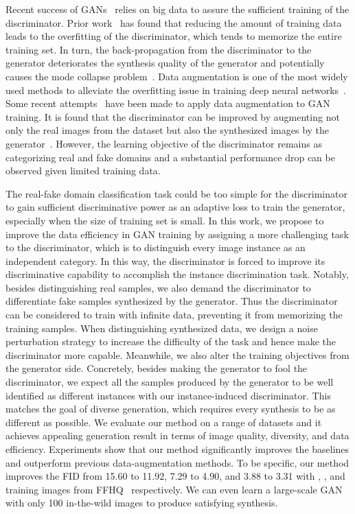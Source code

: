 \documentclass{article}
\begin{document}
Recent success of GANs~\cite{karras2017progressive, karras2019style, Karras2019stylegan2, brock2018large} relies on big data to assure the sufficient training of the discriminator.
Prior work~\cite{zhao2020differentiable, karras2020training} has found that reducing the amount of training data leads to the overfitting of the discriminator, which tends to memorize the entire training set.
In turn, the back-propagation from the discriminator to the generator deteriorates the synthesis quality of the generator and potentially causes the mode collapse problem~\cite{arjovsky2017towards, zhang2018pa}.
Data augmentation is one of the most widely used methods to alleviate the overfitting issue in training deep neural networks~\cite{zhang2017mixup,cubuk2020randaugment,cubuk2018autoaugment}.
Some recent attempts~\cite{karras2020training, tran2021data, zhao2020differentiable, zhao2020image, zhang2018pa} have been made to apply data augmentation to GAN training.
It is found that the discriminator can be improved by augmenting not only the real images from the dataset but also the synthesized images by the generator~\cite{zhao2020differentiable, karras2020training}.
However, the learning objective of the discriminator remains as categorizing real and fake domains and a substantial performance drop can be observed given limited training data.


The real-fake domain classification task could be too simple for the discriminator to gain sufficient discriminative power as an adaptive loss to train the generator, especially when the size of training set is small.
In this work, we propose to improve the data efficiency in GAN training by assigning a more challenging task to the discriminator, which is to distinguish every image instance as an independent category.
In this way, the discriminator is forced to improve its discriminative capability to accomplish the instance discrimination task.
Notably, besides distinguishing real samples, we also demand the discriminator to differentiate fake samples synthesized by the generator.
Thus the discriminator can be considered to train with infinite data, preventing it from memorizing the training samples.
When distinguishing synthesized data, we design a noise perturbation strategy to increase the difficulty of the task and hence make the discriminator more capable.
Meanwhile, we also alter the training objectives from the generator side.
Concretely, besides making the generator to fool the discriminator, we expect all the samples produced by the generator to be well identified as different instances with our instance-induced discriminator.
This matches the goal of diverse generation, which requires every synthesis to be as different as possible.
We evaluate our method on a range of datasets and it achieves appealing generation result in terms of image quality, diversity, and data efficiency.
Experiments show that our method significantly improves the baselines and outperform previous data-augmentation methods.
To be specific, our method improves the FID from 15.60 to 11.92, 7.29 to 4.90, and 3.88 to 3.31 with , , and  training images from FFHQ~\cite{karras2019style} respectively.
We can even learn a large-scale GAN with only 100 in-the-wild images to produce satisfying synthesis.
\end{document}
